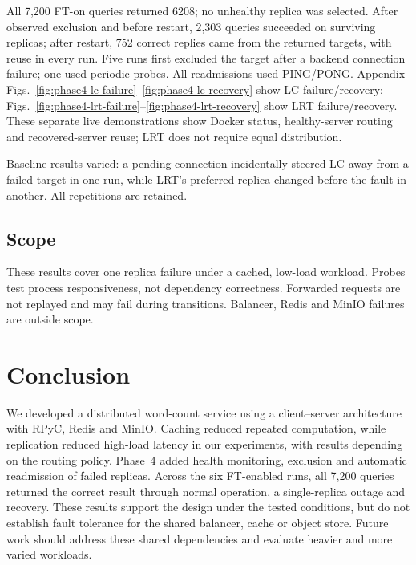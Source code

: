 \documentclass[conference]{IEEEtran}
\begin{document}
All 7,200 FT-on queries returned 6208; no unhealthy replica was selected. After observed exclusion and before restart, 2,303 queries succeeded on surviving replicas; after restart, 752 correct replies came from the returned targets, with reuse in every run. Five runs first excluded the target after a backend connection failure; one used periodic probes. All readmissions used PING/PONG. Appendix Figs.~\ref{fig:phase4-lc-failure}--\ref{fig:phase4-lc-recovery} show LC failure/recovery; Figs.~\ref{fig:phase4-lrt-failure}--\ref{fig:phase4-lrt-recovery} show LRT failure/recovery. These separate live demonstrations show Docker status, healthy-server routing and recovered-server reuse; LRT does not require equal distribution.

Baseline results varied: a pending connection incidentally steered LC away from a failed target in one run, while LRT's preferred replica changed before the fault in another. All repetitions are retained.

\subsection{Scope}
These results cover one replica failure under a cached, low-load workload. Probes test process responsiveness, not dependency correctness. Forwarded requests are not replayed and may fail during transitions. Balancer, Redis and MinIO failures are outside scope.

\section{Conclusion}
We developed a distributed word-count service using a client--server architecture with RPyC, Redis and MinIO. Caching reduced repeated computation, while replication reduced high-load latency in our experiments, with results depending on the routing policy. Phase~4 added health monitoring, exclusion and automatic readmission of failed replicas. Across the six FT-enabled runs, all 7,200 queries returned the correct result through normal operation, a single-replica outage and recovery. These results support the design under the tested conditions, but do not establish fault tolerance for the shared balancer, cache or object store. Future work should address these shared dependencies and evaluate heavier and more varied workloads.

\newcommand{\phasefourshotdir}{../results/phase4/live-demo-2026-10-07/screenshots}

\end{document}
